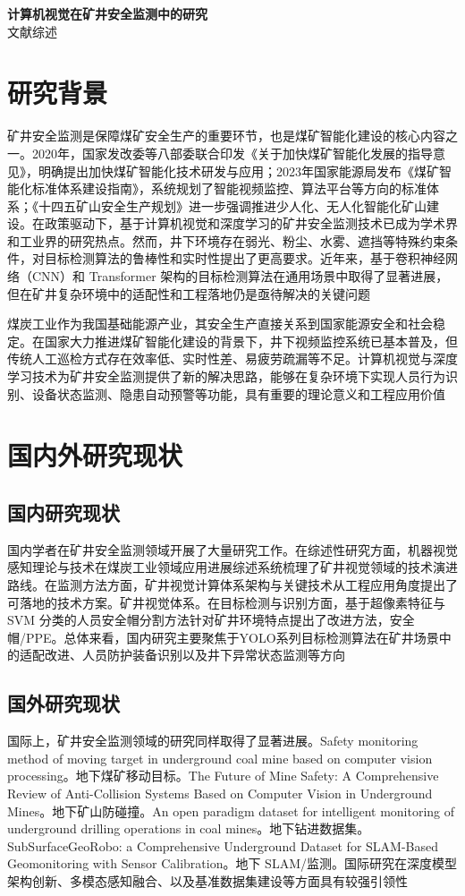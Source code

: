 \documentclass[UTF8,zihao=-4,fontset=fandol]{ctexart}
\renewcommand{\maketitle}{
  \begin{center}
    \vspace*{0.8cm}
    {\bfseries\fontsize{22bp}{26bp}\selectfont 计算机视觉在矿井安全监测中的研究}\\[0.6cm]
    {\fontsize{14bp}{18bp}\selectfont 文献综述}
  \end{center}
  \vspace{0.8cm}
}
\begin{document}
\maketitle
\pagestyle{plain}

\section{研究背景}
矿井安全监测是保障煤矿安全生产的重要环节，也是煤矿智能化建设的核心内容之一。2020年，国家发改委等八部委联合印发《关于加快煤矿智能化发展的指导意见》，明确提出加快煤矿智能化技术研发与应用；2023年国家能源局发布《煤矿智能化标准体系建设指南》，系统规划了智能视频监控、算法平台等方向的标准体系；《十四五矿山安全生产规划》进一步强调推进少人化、无人化智能化矿山建设。在政策驱动下，基于计算机视觉和深度学习的矿井安全监测技术已成为学术界和工业界的研究热点。然而，井下环境存在弱光、粉尘、水雾、遮挡等特殊约束条件，对目标检测算法的鲁棒性和实时性提出了更高要求。近年来，基于卷积神经网络（CNN）和 Transformer 架构的目标检测算法在通用场景中取得了显著进展，但在矿井复杂环境中的适配性和工程落地仍是亟待解决的关键问题

煤炭工业作为我国基础能源产业，其安全生产直接关系到国家能源安全和社会稳定。在国家大力推进煤矿智能化建设的背景下，井下视频监控系统已基本普及，但传统人工巡检方式存在效率低、实时性差、易疲劳疏漏等不足。计算机视觉与深度学习技术为矿井安全监测提供了新的解决思路，能够在复杂环境下实现人员行为识别、设备状态监测、隐患自动预警等功能，具有重要的理论意义和工程应用价值

\section{国内外研究现状}
\subsection{国内研究现状}
国内学者在矿井安全监测领域开展了大量研究工作。在综述性研究方面，机器视觉感知理论与技术在煤炭工业领域应用进展综述系统梳理了矿井视觉领域的技术演进路线。在监测方法方面，矿井视觉计算体系架构与关键技术从工程应用角度提出了可落地的技术方案。矿井视觉体系。在目标检测与识别方面，基于超像素特征与 SVM 分类的人员安全帽分割方法针对矿井环境特点提出了改进方法，安全帽/PPE。总体来看，国内研究主要聚焦于YOLO系列目标检测算法在矿井场景中的适配改进、人员防护装备识别以及井下异常状态监测等方向

\subsection{国外研究现状}
国际上，矿井安全监测领域的研究同样取得了显著进展。Safety monitoring method of moving target in underground coal mine based on computer vision processing。地下煤矿移动目标。The Future of Mine Safety: A Comprehensive Review of Anti-Collision Systems Based on Computer Vision in Underground Mines。地下矿山防碰撞。An open paradigm dataset for intelligent monitoring of underground drilling operations in coal mines。地下钻进数据集。SubSurfaceGeoRobo: a Comprehensive Underground Dataset for SLAM-Based Geomonitoring with Sensor Calibration。地下 SLAM/监测。国际研究在深度模型架构创新、多模态感知融合、以及基准数据集建设等方面具有较强引领性
\end{document}
